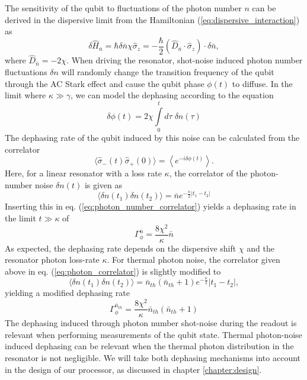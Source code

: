\smallskip

The sensitivity of the qubit to fluctuations of the photon number $n$ can be derived in the dispersive limit from the Hamiltonian (\ref{eq:dispersive_interaction}) as
%
\begin{equation}
\delta \hat{H}_{\bar{n}}=\hbar\delta\bar{n}\chi\hat{\sigma}_z = -\frac{\hbar}{2}\left(\hat{D}_{\bar{n}}\cdot\hat{\sigma}_z\right)\cdot \delta \bar{n},
\end{equation}
%
where $\hat{D}_{\bar{n}}=-2\chi$. When driving the resonator, shot-noise induced photon number fluctuations $\delta n$ will randomly change the transition frequency of the qubit through the AC Stark effect and cause the qubit phase $\phi(t)$ to diffuse. In the limit where $\kappa\gg \gamma$, we can model the dephasing according to the equation
%
\begin{equation}
\delta \phi(t) = 2\chi\int\limits_0^t d\tau \; \delta n(\tau)
\end{equation}
%
The dephasing rate of the qubit induced by this noise can be calculated from the correlator
%
\begin{equation}
\langle \hat{\sigma}_-(t)\hat{\sigma}_+(0)\rangle = \left\langle e^{-i\delta \phi(t)}\right\rangle. \label{eq:photon_number_correlator}
\end{equation}
%
Here, for a linear resonator with a loss rate $\kappa$, the correlator of the photon-number noise $\delta n(t)$ is given as
%
\begin{equation}
\langle \delta n (t_1)\delta n (t_2) \rangle = \bar{n}e^{-\frac{\kappa}{2}|t_1-t_2|} \label{eq:photon_correlator}
\end{equation}
%
Inserting this in eq. (\ref{eq:photon_number_correlator}) yields a dephasing rate in the limit $t \gg \kappa$ of
%
\begin{equation}
\Gamma_\phi^{\bar{n}} = \frac{8\chi^2}{\kappa}\bar{n} \label{eq:photon_number_dephasing_rate}
\end{equation}
%
As expected, the dephasing rate depends on the dispersive shift $\chi$ and the resonator photon loss-rate $\kappa$. For thermal photon noise, the correlator given above in eq. (\ref{eq:photon_correlator}) is slightly modified to
%
\begin{equation}
\langle \delta n(t_1)\delta n (t_2)\rangle = \bar{n}_{th}(\bar{n}_{th}+1)e^{-\frac{\kappa}{2}}|t_1-t_2|,
\end{equation}
%
yielding a modified dephasing rate
%
\begin{equation}
\Gamma_\phi^{\bar{n}_{th}} = \frac{8\chi^2}{\kappa}\bar{n}_{th}(\bar{n}_{th}+1) \label{eq:thermal_photon_number_dephasing_rate}
\end{equation}
%
The dephasing induced through photon number shot-noise during the readout is relevant when performing measurements of the qubit state. Thermal photon-noise induced dephasing can be relevant when the thermal photon distribution in the resonator is not negligible. We will take both dephasing mechanisms into account in the design of our processor, as discussed in chapter \ref{chapter:design}.

